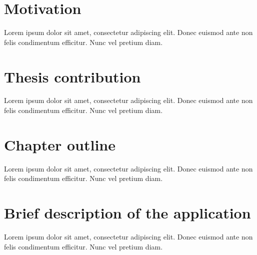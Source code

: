 \section{Motivation}
  Lorem ipsum dolor sit amet, consectetur adipiscing elit. Donec euismod ante
  non felis condimentum efficitur. Nunc vel pretium diam.

\section{Thesis contribution}
  Lorem ipsum dolor sit amet, consectetur adipiscing elit. Donec euismod ante
  non felis condimentum efficitur. Nunc vel pretium diam.

\section{Chapter outline}
  Lorem ipsum dolor sit amet, consectetur adipiscing elit. Donec euismod ante
  non felis condimentum efficitur. Nunc vel pretium diam.

\section{Brief description of the application}
  Lorem ipsum dolor sit amet, consectetur adipiscing elit. Donec euismod ante
  non felis condimentum efficitur. Nunc vel pretium diam.
